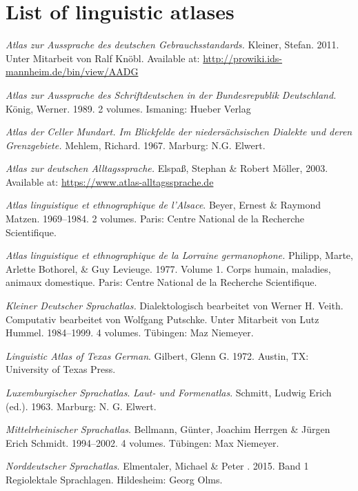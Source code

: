 \chapter{List of linguistic atlases}\label{appendix:l}
\begin{description}[font=\normalfont]\sloppy
\item[AADG:] \textit{Atlas zur Aussprache des deutschen Gebrauchsstandards.} Kleiner,  Stefan. 2011. Unter Mitarbeit von Ralf Knöbl. Available at: \url{http://prowiki.ids-mannheim.de/bin/view/AADG}
\item[AAS:]  \textit{Atlas zur Aussprache des Schriftdeutschen in der Bundesrepublik Deutschland.} König,  Werner. 1989.  2 volumes. Ismaning: Hueber Verlag
\item[ACeM:]  \textit{Atlas der Celler Mundart. Im Blickfelde der niedersächsischen Dialekte und deren Grenzgebiete.} Mehlem, Richard. 1967. Marburg: N.G. Elwert.
\item[ADA:] \textit{Atlas zur deutschen Alltagssprache.} Elspaß, Stephan \& Robert Möller,  2003.  Available at: \url{https://www.atlas-alltagssprache.de}
\item[ALA:] \textit{Atlas linguistique et ethnographique de l’Alsace}. Beyer, Ernest \& Raymond Matzen. 1969--1984. 2 volumes. Paris: Centre National de la Recherche Scientifique.
\item[ALLG:] \textit{Atlas linguistique et ethnographique de la Lorraine germanophone.} Philipp, Marte, Arlette Bothorel, \& Guy Levieuge. 1977. Volume 1. Corps humain, maladies, animaux domestique. Paris: Centre National de la Recherche Scientifique.
\item[KDSA:] \textit{Kleiner Deutscher Sprachatlas.} Dialektologisch bearbeitet von Werner H. Veith. Computativ bearbeitet von Wolfgang Putschke. Unter Mitarbeit von Lutz Hummel. 1984--1999. 4 volumes. Tübingen: Maz Niemeyer.
\item[LATG:]  \textit{Linguistic Atlas of Texas German}. Gilbert, Glenn G. 1972. Austin, TX: University of Texas Press.
\item[LSA:]  \textit{Luxemburgischer Sprachatlas}. \textit{Laut- und Formenatlas}. Schmitt, Ludwig Erich (ed.). 1963. Marburg: N. G. Elwert.
\item[MRhSA:] \textit{Mittelrheinischer Sprachatlas}. Bellmann, Günter, Joachim Herrgen \& Jürgen Erich Schmidt. 1994--2002. 4 volumes. Tübingen: Max Niemeyer.
\item[NOSA:]   \textit{Norddeutscher Sprachatlas}. Elmentaler, Michael \& Peter . 2015. Band 1 Regiolektale Sprachlagen. Hildesheim: Georg Olms.

\end{description}
